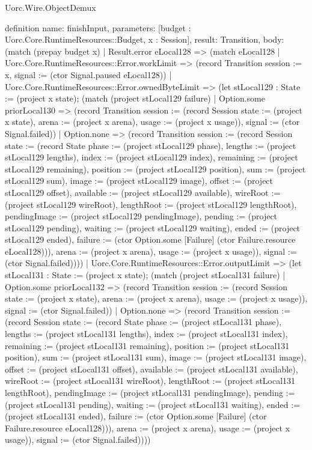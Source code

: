 \begin{lexlean}{Uorc.Wire.ObjectDemux}
\begin{semanticmodule}
definition{
  name: finishInput,
  parameters: [budget : Uorc.Core.RuntimeResources::Budget, x : Session],
  result: Transition,
  body: (match (prepay budget x)
    | Result.error eLocal128 => (match eLocal128
      | Uorc.Core.RuntimeResources::Error.workLimit => (record Transition {session := x, signal := (ctor Signal.paused eLocal128)})
      | Uorc.Core.RuntimeResources::Error.ownedByteLimit => (let stLocal129 : State := (project x state); (match (project stLocal129 failure)
        | Option.some priorLocal130 => (record Transition {session := (record Session {state := (project x state), arena := (project x arena), usage := (project x usage)}), signal := (ctor Signal.failed)})
        | Option.none => (record Transition {session := (record Session {state := (record State {phase := (project stLocal129 phase), lengths := (project stLocal129 lengths), index := (project stLocal129 index), remaining := (project stLocal129 remaining), position := (project stLocal129 position), sum := (project stLocal129 sum), image := (project stLocal129 image), offset := (project stLocal129 offset), available := (project stLocal129 available), wireRoot := (project stLocal129 wireRoot), lengthRoot := (project stLocal129 lengthRoot), pendingImage := (project stLocal129 pendingImage), pending := (project stLocal129 pending), waiting := (project stLocal129 waiting), ended := (project stLocal129 ended), failure := (ctor Option.some [Failure] (ctor Failure.resource eLocal128))}), arena := (project x arena), usage := (project x usage)}), signal := (ctor Signal.failed)})))
      | Uorc.Core.RuntimeResources::Error.outputLimit => (let stLocal131 : State := (project x state); (match (project stLocal131 failure)
        | Option.some priorLocal132 => (record Transition {session := (record Session {state := (project x state), arena := (project x arena), usage := (project x usage)}), signal := (ctor Signal.failed)})
        | Option.none => (record Transition {session := (record Session {state := (record State {phase := (project stLocal131 phase), lengths := (project stLocal131 lengths), index := (project stLocal131 index), remaining := (project stLocal131 remaining), position := (project stLocal131 position), sum := (project stLocal131 sum), image := (project stLocal131 image), offset := (project stLocal131 offset), available := (project stLocal131 available), wireRoot := (project stLocal131 wireRoot), lengthRoot := (project stLocal131 lengthRoot), pendingImage := (project stLocal131 pendingImage), pending := (project stLocal131 pending), waiting := (project stLocal131 waiting), ended := (project stLocal131 ended), failure := (ctor Option.some [Failure] (ctor Failure.resource eLocal128))}), arena := (project x arena), usage := (project x usage)}), signal := (ctor Signal.failed)})))
}
\end{semanticmodule}
\end{lexlean}
